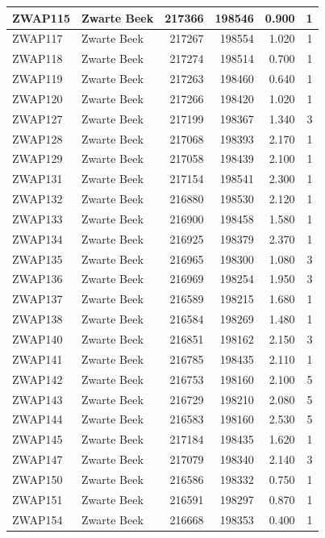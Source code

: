 \documentclass[11pt,]{book}
\begin{document}
\begin{table}
\begin{tabular}[t]{l|l|r|r|r|r}
\hline
ZWAP115 & Zwarte Beek & 217366 & 198546 & 0.900 & 1\\
\hline
ZWAP117 & Zwarte Beek & 217267 & 198554 & 1.020 & 1\\
\hline
ZWAP118 & Zwarte Beek & 217274 & 198514 & 0.700 & 1\\
\hline
ZWAP119 & Zwarte Beek & 217263 & 198460 & 0.640 & 1\\
\hline
ZWAP120 & Zwarte Beek & 217266 & 198420 & 1.020 & 1\\
\hline
ZWAP127 & Zwarte Beek & 217199 & 198367 & 1.340 & 3\\
\hline
ZWAP128 & Zwarte Beek & 217068 & 198393 & 2.170 & 1\\
\hline
ZWAP129 & Zwarte Beek & 217058 & 198439 & 2.100 & 1\\
\hline
ZWAP131 & Zwarte Beek & 217154 & 198541 & 2.300 & 1\\
\hline
ZWAP132 & Zwarte Beek & 216880 & 198530 & 2.120 & 1\\
\hline
ZWAP133 & Zwarte Beek & 216900 & 198458 & 1.580 & 1\\
\hline
ZWAP134 & Zwarte Beek & 216925 & 198379 & 2.370 & 1\\
\hline
ZWAP135 & Zwarte Beek & 216965 & 198300 & 1.080 & 3\\
\hline
ZWAP136 & Zwarte Beek & 216969 & 198254 & 1.950 & 3\\
\hline
ZWAP137 & Zwarte Beek & 216589 & 198215 & 1.680 & 1\\
\hline
ZWAP138 & Zwarte Beek & 216584 & 198269 & 1.480 & 1\\
\hline
ZWAP140 & Zwarte Beek & 216851 & 198162 & 2.150 & 3\\
\hline
ZWAP141 & Zwarte Beek & 216785 & 198435 & 2.110 & 1\\
\hline
ZWAP142 & Zwarte Beek & 216753 & 198160 & 2.100 & 5\\
\hline
ZWAP143 & Zwarte Beek & 216729 & 198210 & 2.080 & 5\\
\hline
ZWAP144 & Zwarte Beek & 216583 & 198160 & 2.530 & 5\\
\hline
ZWAP145 & Zwarte Beek & 217184 & 198435 & 1.620 & 1\\
\hline
ZWAP147 & Zwarte Beek & 217079 & 198340 & 2.140 & 3\\
\hline
ZWAP150 & Zwarte Beek & 216586 & 198332 & 0.750 & 1\\
\hline
ZWAP151 & Zwarte Beek & 216591 & 198297 & 0.870 & 1\\
\hline
ZWAP154 & Zwarte Beek & 216668 & 198353 & 0.400 & 1\\

\end{tabular}
\end{table}
\end{document}
